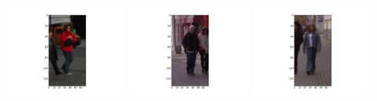 \includegraphics[width=4cm]{dbshow-4-7.png} 
\includegraphics[width=4cm]{dbshow-4-8.png} 
\includegraphics[width=4cm]{dbshow-4-9.png} 
